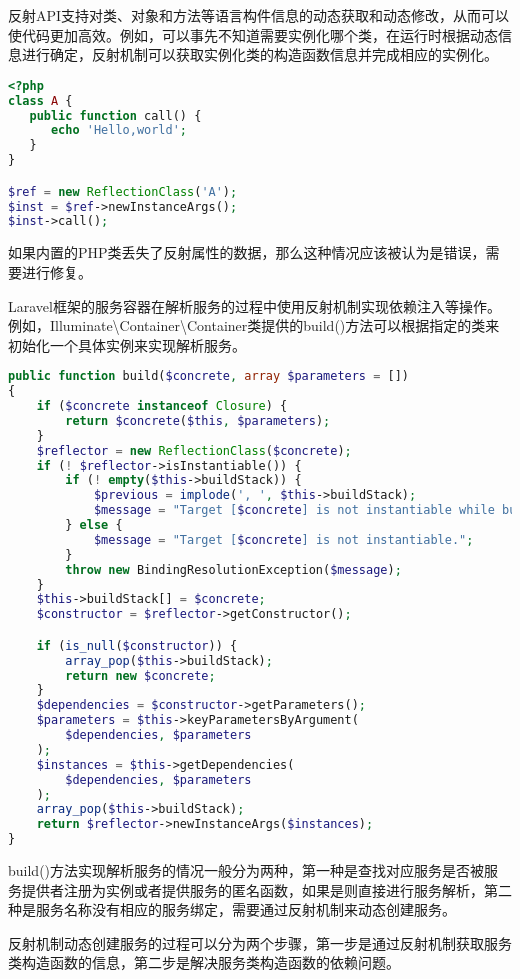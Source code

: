 反射API支持对类、对象和方法等语言构件信息的动态获取和动态修改，从而可以使代码更加高效。例如，可以事先不知道需要实例化哪个类，在运行时根据动态信息进行确定，反射机制可以获取实例化类的构造函数信息并完成相应的实例化。

\begin{lstlisting}[language=PHP]
<?php
class A {
   public function call() {
      echo 'Hello,world';
   }
}

$ref = new ReflectionClass('A');
$inst = $ref->newInstanceArgs();
$inst->call();
\end{lstlisting}

如果内置的PHP类丢失了反射属性的数据，那么这种情况应该被认为是错误，需要进行修复。

Laravel框架的服务容器在解析服务的过程中使用反射机制实现依赖注入等操作。例如，Illuminate\textbackslash Container\textbackslash Container类提供的build()方法可以根据指定的类来初始化一个具体实例来实现解析服务。

\begin{lstlisting}[language=PHP]
public function build($concrete, array $parameters = [])
{
    if ($concrete instanceof Closure) {
        return $concrete($this, $parameters);
    }
    $reflector = new ReflectionClass($concrete);
    if (! $reflector->isInstantiable()) {
        if (! empty($this->buildStack)) {
            $previous = implode(', ', $this->buildStack);
            $message = "Target [$concrete] is not instantiable while building [$previous].";
        } else {
            $message = "Target [$concrete] is not instantiable.";
        }
        throw new BindingResolutionException($message);
    }
    $this->buildStack[] = $concrete;
    $constructor = $reflector->getConstructor();

    if (is_null($constructor)) {
        array_pop($this->buildStack);
        return new $concrete;
    }
    $dependencies = $constructor->getParameters();
    $parameters = $this->keyParametersByArgument(
        $dependencies, $parameters
    );
    $instances = $this->getDependencies(
        $dependencies, $parameters
    );
    array_pop($this->buildStack);
    return $reflector->newInstanceArgs($instances);
}
\end{lstlisting}

build()方法实现解析服务的情况一般分为两种，第一种是查找对应服务是否被服务提供者注册为实例或者提供服务的匿名函数，如果是则直接进行服务解析，第二种是服务名称没有相应的服务绑定，需要通过反射机制来动态创建服务。

反射机制动态创建服务的过程可以分为两个步骤，第一步是通过反射机制获取服务类构造函数的信息，第二步是解决服务类构造函数的依赖问题。

